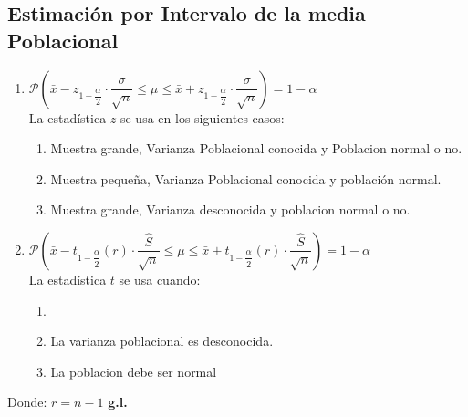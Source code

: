 \subsection{Estimación por Intervalo de la media Poblacional}
\begin{enumerate}[label=\textbf{(\Roman*)}]
  \item $\mathcal{P}\left(\bar{x} - z_{1-\dfrac{\alpha}{2}}\cdot \dfrac{\sigma}{\sqrt{n}}\leq \mu \leq \bar{x} + z_{1-\dfrac{\alpha}{2}}\cdot \dfrac{\sigma}{\sqrt{n}} \right)=1-\alpha$\\${ }$\\
  La estadística $z$ se usa en los siguientes casos:
  \begin{enumerate}[label=\textbf{(\roman*)}]
  \item Muestra grande, Varianza Poblacional conocida y Poblacion normal o no.
  \item Muestra pequeña, Varianza Poblacional conocida y población normal.
  \item Muestra grande, Varianza desconocida y poblacion normal o no. 
  \end{enumerate}
  \item $\mathcal{P}\left(\bar{x} - t_{1-\dfrac{\alpha}{2}}(r)\cdot \dfrac{\widehat{S}}{\sqrt{n}}\leq \mu \leq \bar{x} + t_{1-\dfrac{\alpha}{2}}(r)\cdot \dfrac{\widehat{S}}{\sqrt{n}} \right)=1-\alpha$\\
  La estadística $t$ se usa cuando:
  \begin{enumerate}[label=\textbf{(\roman*)}]
  \item %
  \item La varianza poblacional es desconocida.
  \item La poblacion debe ser normal
  \end{enumerate}
\end{enumerate}
Donde: $r = n - 1$ \textbf{g.l.}
